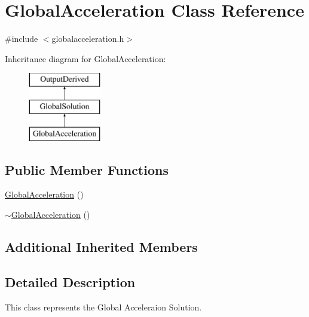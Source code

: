 \hypertarget{class_global_acceleration}{\section{Global\-Acceleration Class Reference}
\label{class_global_acceleration}
}


{\ttfamily \#include $<$globalacceleration.\-h$>$}

Inheritance diagram for Global\-Acceleration\-:\begin{figure}[H]
\begin{center}
\leavevmode
\includegraphics[height=3.000000cm]{class_global_acceleration}
\end{center}
\end{figure}
\subsection*{Public Member Functions}
\begin{DoxyCompactItemize}
\item 
\hyperlink{class_global_acceleration_a37a05fcecd06641847388428a3f43fb8}{Global\-Acceleration} ()
\item 
\hyperlink{class_global_acceleration_aafb7853a1923f0e06b96f2ef4eca03d3}{$\sim$\-Global\-Acceleration} ()
\end{DoxyCompactItemize}
\subsection*{Additional Inherited Members}


\subsection{Detailed Description}
This class represents the Global Acceleraion Solution. 

